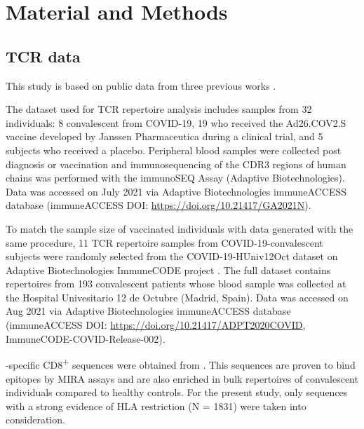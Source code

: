 \chapter*{Material and Methods}
\label{chap:matmed}


\section*{TCR data}

This study is based on public data from three previous works \citep{janssen, immunecode, metaclonotypes}.

The dataset used for TCR repertoire analysis \citep{janssen} includes samples from 32 individuals: 8 convalescent from COVID-19, 19 who received the Ad26.COV2.S vaccine developed by Janssen Pharmaceutica during a clinical trial, and 5 subjects who received a placebo. Peripheral blood samples were collected post diagnosis or vaccination and immunosequencing of the CDR3 regions of human \TCRB{} chains was performed with the immunoSEQ Assay (Adaptive Biotechnologies). Data was accessed on July 2021 via Adaptive Biotechnologies immuneACCESS\textregistered{} database (immuneACCESS\textregistered{} DOI: \url{https://doi.org/10.21417/GA2021N}).

To match the sample size of vaccinated individuals with data generated with the same procedure, 11 TCR repertoire samples from COVID-19-convalescent subjects were randomly selected from the COVID-19-HUniv12Oct dataset on Adaptive Biotechnologies ImmuneCODE\texttrademark{} project \citep{immunecode}. The full dataset contains \TCRB{} repertoires from 193 convalescent patients whose blood sample was collected at the Hospital Univesitario 12 de Octubre (Madrid, Spain). Data was accessed on Aug 2021 via Adaptive Biotechnologies immuneACCESS\textregistered{} database (immuneACCESS\textregistered{} DOI: \url{https://doi.org/10.21417/ADPT2020COVID}, ImmuneCODE-COVID-Release-002).


\covid-specific CD8\textsuperscript{+} \TCRB{} sequences were obtained from \cite{metaclonotypes}. This sequences are proven to bind \covid{} epitopes by MIRA assays \citep{immunecode} and are also enriched in bulk \TCRB{} repertoires of convalescent individuals compared to healthy controls. For the present study, only \TCRB{} sequences with a strong evidence of HLA restriction (N = 1831) were taken into consideration.







